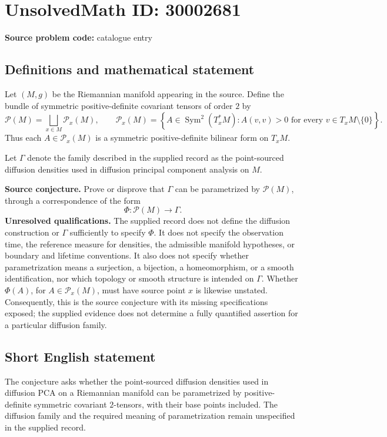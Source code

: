 \documentclass[11pt]{article}
\begin{document}
\section*{UnsolvedMath ID: 30002681}
\textbf{Source problem code:} catalogue entry
\subsection{Definitions and mathematical statement}
Let \((M,g)\) be the Riemannian manifold appearing in the source. Define the bundle of symmetric positive-definite covariant tensors of order \(2\) by
\[
\mathcal P(M)=\bigsqcup_{x\in M}\mathcal P_x(M),\qquad
\mathcal P_x(M)=\left\{A\in\operatorname{Sym}^2(T_x^*M): A(v,v)>0\text{ for every }v\in T_xM\setminus\{0\}\right\}.
\]
Thus each \(A\in\mathcal P_x(M)\) is a symmetric positive-definite bilinear form on \(T_xM\).

Let \(\Gamma\) denote the family described in the supplied record as the point-sourced diffusion densities used in diffusion principal component analysis on \(M\).

\textbf{Source conjecture.} Prove or disprove that \(\Gamma\) can be parametrized by \(\mathcal P(M)\), through a correspondence of the form
\[
\Phi:\mathcal P(M)\longrightarrow\Gamma.
\]
\textbf{Unresolved qualifications.} The supplied record does not define the diffusion construction or \(\Gamma\) sufficiently to specify \(\Phi\). It does not specify the observation time, the reference measure for densities, the admissible manifold hypotheses, or boundary and lifetime conventions. It also does not specify whether parametrization means a surjection, a bijection, a homeomorphism, or a smooth identification, nor which topology or smooth structure is intended on \(\Gamma\). Whether \(\Phi(A)\), for \(A\in\mathcal P_x(M)\), must have source point \(x\) is likewise unstated. Consequently, this is the source conjecture with its missing specifications exposed; the supplied evidence does not determine a fully quantified assertion for a particular diffusion family.
\subsection{Short English statement}
The conjecture asks whether the point-sourced diffusion densities used in diffusion PCA on a Riemannian manifold can be parametrized by positive-definite symmetric covariant \(2\)-tensors, with their base points included. The diffusion family and the required meaning of parametrization remain unspecified in the supplied record.
\end{document}
